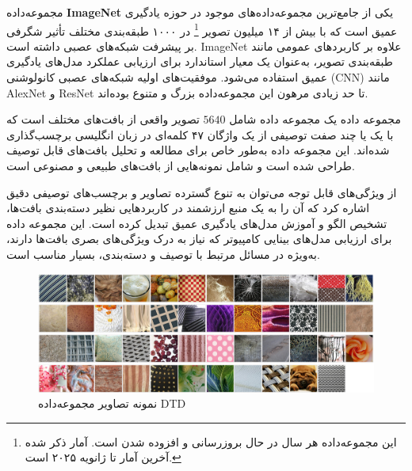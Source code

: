 مجموعه‌داده \textbf{ImageNet} یکی از جامع‌ترین مجموعه‌داده‌های موجود در حوزه یادگیری عمیق است که با بیش از ۱۴ میلیون تصویر
\footnote{این مجموعه‌داده هر سال در حال بروزرسانی و افزوده شدن است. آمار ذکر شده آخرین آمار تا ژانویه ۲۰۲۵ است.}
در ۱۰۰۰ طبقه‌بندی مختلف تأثیر شگرفی بر پیشرفت شبکه‌های عصبی داشته است. ImageNet علاوه بر کاربردهای عمومی مانند طبقه‌بندی تصویر، به‌عنوان یک معیار استاندارد برای ارزیابی عملکرد مدل‌های یادگیری عمیق استفاده می‌شود. موفقیت‌های اولیه شبکه‌های عصبی کانولوشنی (CNN) مانند AlexNet و ResNet تا حد زیادی مرهون این مجموعه‌داده بزرگ و متنوع بوده‌اند.



مجموعه داده
یک مجموعه داده شامل $5640$ تصویر واقعی از بافت‌های مختلف است که با یک یا چند صفت توصیفی از یک واژگان ۴۷ کلمه‌ای در زبان انگلیسی برچسب‌گذاری شده‌اند. این مجموعه داده به‌طور خاص برای مطالعه و تحلیل بافت‌های قابل توصیف طراحی شده است و شامل نمونه‌هایی از بافت‌های طبیعی و مصنوعی است. 

از ویژگی‌های قابل توجه  می‌توان به تنوع گسترده تصاویر و برچسب‌های توصیفی دقیق اشاره کرد که آن را به یک منبع ارزشمند در کاربردهایی نظیر دسته‌بندی بافت‌ها، تشخیص الگو و آموزش مدل‌های یادگیری عمیق تبدیل کرده است. این مجموعه داده برای ارزیابی مدل‌های بینایی کامپیوتر که نیاز به درک ویژگی‌های بصری بافت‌ها دارند، به‌ویژه در مسائل مرتبط با توصیف و دسته‌بندی، بسیار مناسب است.

\warningToSelfExpandable

\begin{figure}
	\centering
	\includegraphics[width=0.7\linewidth]{dtd1}
	\caption{نمونه تصاویر مجموعه‌داده DTD}
	\label{fig:dtd1}
\end{figure}




